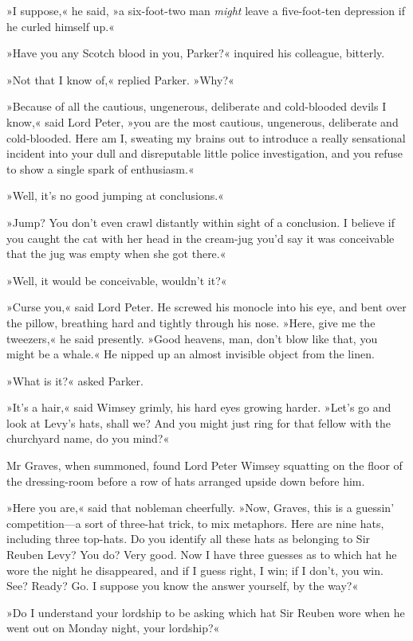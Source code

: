 »I suppose,« he said, »a six-foot-two man \textit{might} leave a five-foot-ten depression if he curled himself up.«

»Have you any Scotch blood in you, Parker?« inquired his colleague, bitterly.

»Not that I know of,« replied Parker. »Why?«

»Because of all the cautious, ungenerous, deliberate and cold-blooded devils I know,« said Lord Peter, »you are the most cautious, ungenerous, deliberate and cold-blooded. Here am I, sweating my brains out to introduce a really sensational incident into your dull and disreputable little police investigation, and you refuse to show a single spark of enthusiasm.«

»Well, it's no good jumping at conclusions.«

»Jump? You don't even crawl distantly within sight of a conclusion. I believe if you caught the cat with her head in the cream-jug you'd say it was conceivable that the jug was empty when she got there.«

»Well, it would be conceivable, wouldn't it?«

»Curse you,« said Lord Peter. He screwed his monocle into his eye, and bent over the pillow, breathing hard and tightly through his nose. »Here, give me the tweezers,« he said presently. »Good heavens, man, don't blow like that, you might be a whale.« He nipped up an almost invisible object from the linen.

»What is it?« asked Parker.

»It's a hair,« said Wimsey grimly, his hard eyes growing harder. »Let's go and look at Levy's hats, shall we? And you might just ring for that fellow with the churchyard name, do you mind?«

Mr Graves, when summoned, found Lord Peter Wimsey squatting on the floor of the dressing-room before a row of hats arranged upside down before him.

»Here you are,« said that nobleman cheerfully. »Now, Graves, this is a guessin' competition\allowbreak---\allowbreak a sort of three-hat trick, to mix metaphors. Here are nine hats, including three top-hats. Do you identify all these hats as belonging to Sir Reuben Levy? You do? Very good. Now I have three guesses as to which hat he wore the night he disappeared, and if I guess right, I win; if I don't, you win. See? Ready? Go. I suppose you know the answer yourself, by the way?«

»Do I understand your lordship to be asking which hat Sir Reuben wore when he went out on Monday night, your lordship?«

